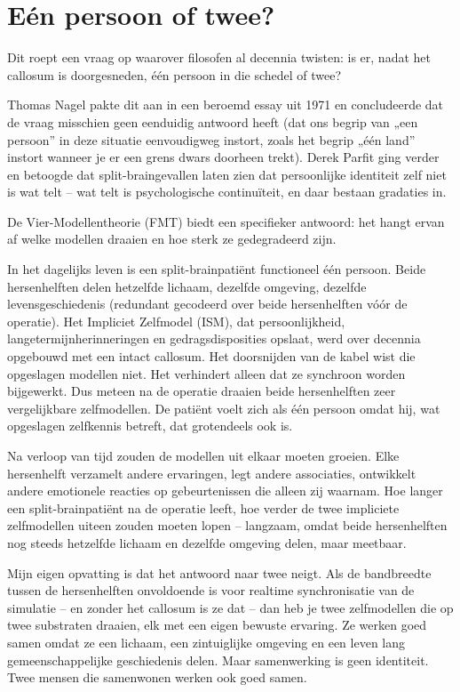 \documentclass[11pt, twoside, openright]{book}
\begin{document}
\section*{Eén persoon of twee?}

Dit roept een vraag op waarover filosofen al decennia twisten: is er, nadat het callosum is doorgesneden, één persoon in die schedel of twee?

Thomas Nagel pakte dit aan in een beroemd essay uit 1971 en concludeerde dat de vraag misschien geen eenduidig antwoord heeft (dat ons begrip van „een persoon” in deze situatie eenvoudigweg instort, zoals het begrip „één land” instort wanneer je er een grens dwars doorheen trekt). Derek Parfit ging verder en betoogde dat split-braingevallen laten zien dat persoonlijke identiteit zelf niet is wat telt -- wat telt is psychologische continuïteit, en daar bestaan gradaties in.

De Vier-Modellentheorie (FMT) biedt een specifieker antwoord: het hangt ervan af welke modellen draaien en hoe sterk ze gedegradeerd zijn.

In het dagelijks leven is een split-brainpatiënt functioneel één persoon. Beide hersenhelften delen hetzelfde lichaam, dezelfde omgeving, dezelfde levensgeschiedenis (redundant gecodeerd over beide hersenhelften vóór de operatie). Het Impliciet Zelfmodel (ISM), dat persoonlijkheid, langetermijnherinneringen en gedragsdisposities opslaat, werd over decennia opgebouwd met een intact callosum. Het doorsnijden van de kabel wist die opgeslagen modellen niet. Het verhindert alleen dat ze synchroon worden bijgewerkt. Dus meteen na de operatie draaien beide hersenhelften zeer vergelijkbare zelfmodellen. De patiënt voelt zich als één persoon omdat hij, wat opgeslagen zelfkennis betreft, dat grotendeels ook is.

Na verloop van tijd zouden de modellen uit elkaar moeten groeien. Elke hersenhelft verzamelt andere ervaringen, legt andere associaties, ontwikkelt andere emotionele reacties op gebeurtenissen die alleen zij waarnam. Hoe langer een split-brainpatiënt na de operatie leeft, hoe verder de twee impliciete zelfmodellen uiteen zouden moeten lopen -- langzaam, omdat beide hersenhelften nog steeds hetzelfde lichaam en dezelfde omgeving delen, maar meetbaar.

Mijn eigen opvatting is dat het antwoord naar twee neigt. Als de bandbreedte tussen de hersenhelften onvoldoende is voor realtime synchronisatie van de simulatie -- en zonder het callosum is ze dat -- dan heb je twee zelfmodellen die op twee substraten draaien, elk met een eigen bewuste ervaring. Ze werken goed samen omdat ze een lichaam, een zintuiglijke omgeving en een leven lang gemeenschappelijke geschiedenis delen. Maar samenwerking is geen identiteit. Twee mensen die samenwonen werken ook goed samen.
\end{document}
